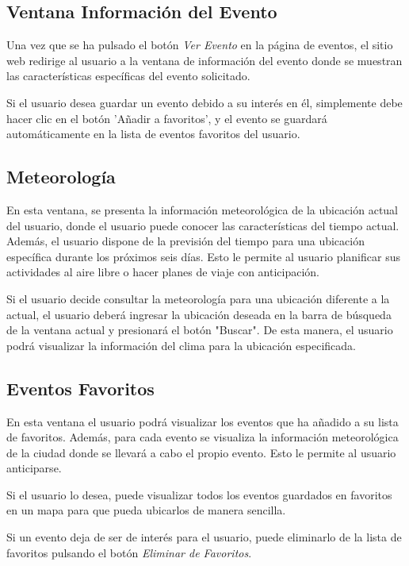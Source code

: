 
\newpage
\subsection{Ventana Información del Evento}


Una vez que se ha pulsado el botón \textit{Ver Evento} en la página de eventos, el sitio web redirige al usuario a la ventana de información del evento donde se muestran las características específicas del evento solicitado.

Si el usuario desea guardar un evento debido a su interés en él, simplemente debe hacer clic en el botón 'Añadir a favoritos', y el evento se guardará automáticamente en la lista de eventos favoritos del usuario.

\newpage
\subsection{Meteorología}


En esta ventana, se presenta la información meteorológica de la ubicación actual del usuario, donde el usuario puede conocer las características del tiempo actual. Además, el usuario dispone de la previsión del tiempo para una ubicación específica durante los próximos seis días. Esto le permite al usuario planificar sus actividades al aire libre o hacer planes de viaje con anticipación.

Si el usuario decide consultar la meteorología para una ubicación diferente a la actual, el usuario deberá ingresar la ubicación deseada en la barra de búsqueda de la ventana actual y presionará el botón "Buscar". De esta manera, el usuario podrá visualizar la información del clima para la ubicación especificada. 

\newpage
\subsection{Eventos Favoritos}
En esta ventana el usuario podrá visualizar los eventos que ha añadido a su lista de favoritos. Además, para cada evento se visualiza la información meteorológica de la ciudad donde se llevará a cabo el propio evento. Esto le permite al usuario anticiparse.

Si el usuario lo desea, puede visualizar todos los eventos guardados en favoritos en un mapa para que  pueda ubicarlos de manera sencilla.

Si un evento deja de ser de interés para el usuario, puede eliminarlo de la lista de favoritos pulsando el botón \textit{Eliminar de Favoritos}.


